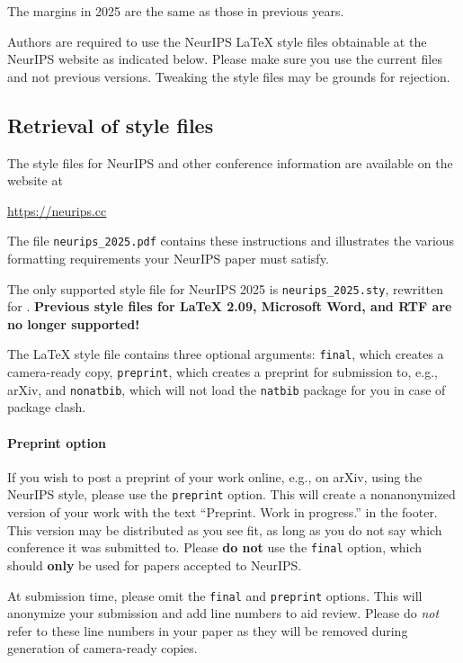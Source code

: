 \documentclass{article}
\begin{document}
The margins in 2025 are the same as those in previous years.


Authors are required to use the NeurIPS \LaTeX{} style files obtainable at the
NeurIPS website as indicated below. Please make sure you use the current files
and not previous versions. Tweaking the style files may be grounds for
rejection.


\subsection{Retrieval of style files}


The style files for NeurIPS and other conference information are available on
the website at
\begin{center}
  \url{https://neurips.cc}
\end{center}
The file \verb+neurips_2025.pdf+ contains these instructions and illustrates the
various formatting requirements your NeurIPS paper must satisfy.


The only supported style file for NeurIPS 2025 is \verb+neurips_2025.sty+,
rewritten for \LaTeXe{}.  \textbf{Previous style files for \LaTeX{} 2.09,
  Microsoft Word, and RTF are no longer supported!}


The \LaTeX{} style file contains three optional arguments: \verb+final+, which
creates a camera-ready copy, \verb+preprint+, which creates a preprint for
submission to, e.g., arXiv, and \verb+nonatbib+, which will not load the
\verb+natbib+ package for you in case of package clash.


\paragraph{Preprint option}
If you wish to post a preprint of your work online, e.g., on arXiv, using the
NeurIPS style, please use the \verb+preprint+ option. This will create a
nonanonymized version of your work with the text ``Preprint. Work in progress.''
in the footer. This version may be distributed as you see fit, as long as you do not say which conference it was submitted to. Please \textbf{do
  not} use the \verb+final+ option, which should \textbf{only} be used for
papers accepted to NeurIPS.


At submission time, please omit the \verb+final+ and \verb+preprint+
options. This will anonymize your submission and add line numbers to aid
review. Please do \emph{not} refer to these line numbers in your paper as they
will be removed during generation of camera-ready copies.
\end{document}
